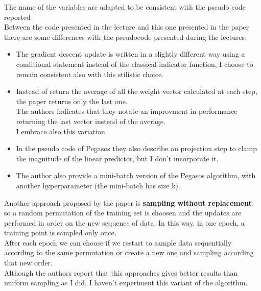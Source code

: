The name of the variables are adapted to be consistent with the pseudo code reported\\
Between the code presented in the lecture and this one presented in the paper there are some differences with the pseudocode presented during the lectures:\\
\begin{itemize}
    \item The gradient descent update is written in a slightly different way using a conditional statement instead of the classical indicator function, I choose to remain consistent also with this stilistic choice.\\
    \item Instead of return the average of all the weight vector calculated at each step, the paper returns only the last one.\\ 
    The authors indicates that they notate an improvment in performance returning the last vector instead of the average.\\ 
    I embrace also this variation.\\
    \item In the pseudo code of Pegasos they also describe an projection step to clamp the magnitude of the linear predictor, but I don't incorporate it.\\ 
    \item The author also provide a mini-batch version of the Pegasos algorithm, with another hyperparameter (the mini-batch has size k).\\
\end{itemize}

Another approach proposed by the paper is {\bf sampling without replacement}: so a random permutation of the training set is choosen and the updates are performed in order on the new sequence of data.
In this way, in one epoch, a training point is sampled only once.\\
After each epoch we can choose if we restart to sample data sequentially according to the same permutation or create a new one and sampling according that new order.\\
Although the authors report that this approaches gives better results than uniform sampling as I did, I haven't experiment this variant of the algorithm.\\

